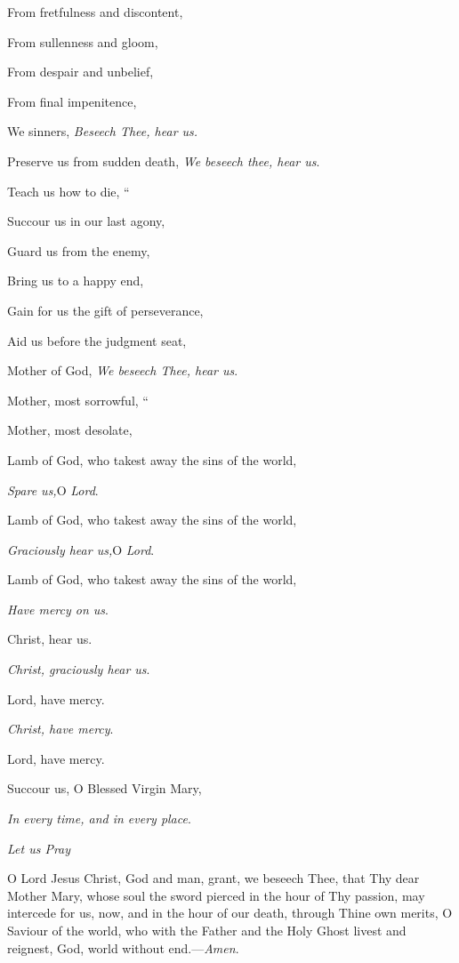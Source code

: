 From fretfulness and discontent,

From sullenness and gloom,

From despair and unbelief,

From final impenitence,

We sinners, \emph{Beseech Thee,
hear us.}

Preserve us from sudden death,
\emph{We beseech thee, hear us}.

Teach us how to die,
``

Succour us in our last agony,

Guard us from the enemy,

Bring us to a happy end,

Gain for us the gift of perseverance,

Aid us before the judgment seat,

Mother of God,
\emph{We beseech Thee, hear us}.

Mother, most sorrowful,
``

Mother, most desolate,

Lamb of God, who takest away the
sins of the world,

\emph{Spare us,}O \emph{Lord}.

Lamb of God, who takest away the sins of the world,

\emph{Graciously hear us,}O \emph{Lord}.

Lamb of God, who takest away the sins of the world,

\emph{Have mercy on us}.

Christ, hear us.

\emph{Christ, graciously hear us}.

Lord, have mercy.

\emph{Christ, have mercy}.

Lord, have mercy.

Succour us, O Blessed Virgin
Mary,

\emph{In every time, and in every place}.

\emph{Let
us Pray}

O Lord Jesus Christ, God and
man, grant, we beseech Thee, that Thy dear Mother Mary, whose soul the
sword pierced in the hour of Thy passion, may intercede for us,
now, and in the hour of our death, through Thine own merits, O Saviour
of the world, who with the Father and the Holy Ghost livest and reignest,
God, world without end.—\emph{Amen}.


